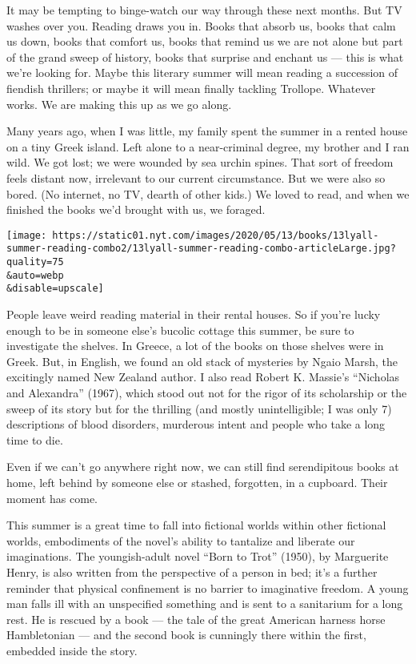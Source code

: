 It may be tempting to binge-watch our way through these next months. But
TV washes over you. Reading draws you in. Books that absorb us, books
that calm us down, books that comfort us, books that remind us we are
not alone but part of the grand sweep of history, books that surprise
and enchant us --- this is what we're looking for. Maybe this literary
summer will mean reading a succession of fiendish thrillers; or maybe it
will mean finally tackling Trollope. Whatever works. We are making this
up as we go along.

Many years ago, when I was little, my family spent the summer in a
rented house on a tiny Greek island. Left alone to a near-criminal
degree, my brother and I ran wild. We got lost; we were wounded by sea
urchin spines. That sort of freedom feels distant now, irrelevant to our
current circumstance. But we were also so bored. (No internet, no TV,
dearth of other kids.) We loved to read, and when we finished the books
we'd brought with us, we foraged.

\texttt{[image: https://static01.nyt.com/images/2020/05/13/books/13lyall-summer-reading-combo2/13lyall-summer-reading-combo-articleLarge.jpg?quality=75\\\&auto=webp\\\&disable=upscale]}

People leave weird reading material in their rental houses. So if you're
lucky enough to be in someone else's bucolic cottage this summer, be
sure to investigate the shelves. In Greece, a lot of the books on those
shelves were in Greek. But, in English, we found an old stack of
mysteries by Ngaio Marsh, the excitingly named New Zealand author. I
also read Robert K. Massie's ``Nicholas and Alexandra'' (1967), which
stood out not for the rigor of its scholarship or the sweep of its story
but for the thrilling (and mostly unintelligible; I was only 7)
descriptions of blood disorders, murderous intent and people who take a
long time to die.

Even if we can't go anywhere right now, we can still find serendipitous
books at home, left behind by someone else or stashed, forgotten, in a
cupboard. Their moment has come.

This summer is a great time to fall into fictional worlds within other
fictional worlds, embodiments of the novel's ability to tantalize and
liberate our imaginations. The youngish-adult novel ``Born to Trot''
(1950), by Marguerite Henry, is also written from the perspective of a
person in bed; it's a further reminder that physical confinement is no
barrier to imaginative freedom. A young man falls ill with an
unspecified something and is sent to a sanitarium for a long rest. He is
rescued by a book --- the tale of the great American harness horse
Hambletonian --- and the second book is cunningly there within the
first, embedded inside the story.

